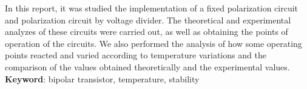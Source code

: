  \setlength{\absparsep}{18pt} %
\begin{resumo}[Abstract]
In this report, it was studied the implementation of a fixed polarization circuit and polarization circuit by voltage divider. The theoretical and experimental analyzes of these circuits were carried out, as well as obtaining the points of operation of the circuits. We also performed the analysis of how some operating points reacted and varied according to temperature variations and the comparison of the values ​​obtained theoretically and the experimental values. \\
 \noindent
 \textbf{Keyword}: bipolar transistor, temperature, stability
 \end{resumo} 